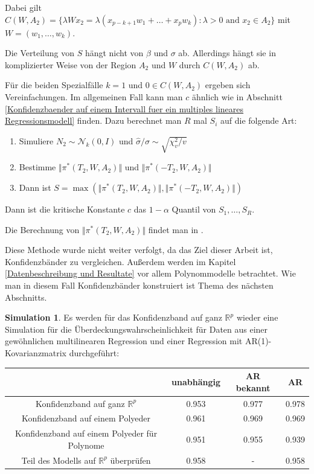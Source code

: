 \documentclass[12pt,a4paper]{article}
\theoremstyle{definition}
\theoremstyle{definition}
\theoremstyle{definition}
\newtheorem{Simulation}[Definition]{Simulation}
\theoremstyle{definition}
\newcommand{\UeberRR}{0.953}
\newcommand{\UeberRMinmax}{0.961}
\newcommand{\UeberRMinmaxPolyfast}{0.951}
\newcommand{\UeberARbekanntR}{0.977}
\newcommand{\UeberARbekanntMinmax}{0.969}
\newcommand{\UeberARbekanntMinmaxPolyfast}{0.955}
\newcommand{\UeberARR}{0.978}
\newcommand{\UeberARMinmax}{0.969}
\newcommand{\UeberARMinmaxPolyfast}{0.939}
\newcommand{\UeberRRpruefen}{0.958}
\newcommand{\UeberARRpruefen}{0.958}
\begin{document}
Dabei gilt $C(W,A_2)=\{ \lambda W x_2 = \lambda(x_{p-k+1} w_1 + \ldots + x_p w_k) : \lambda > 0 \text{ and } x_2 \in A_2 \}$ mit $W=(w_1, \ldots, w_k)$. 

Die Verteilung von $S$ hängt nicht von $\beta$ und $\sigma$ ab. Allerdings hängt sie in komplizierter Weise von der Region $A_2$ und $W$ durch $C(W,A_2)$ ab.

Für die beiden Spezialfälle $k=1$ und $0 \in C(W,A_2)$ ergeben sich Vereinfachungen. Im allgemeinen Fall kann man $c$ ähnlich wie in Abschnitt \ref{Konfidenzbaender auf einem Intervall fuer ein multiples lineares Regressionsmodell} finden. Dazu berechnet man $R$ mal $S_i$ auf die folgende Art:

\begin{enumerate}
\item Simuliere $N_2 \sim \mathscr{N}_{k}(0,I)$ und $\hat{\sigma}/\sigma \sim \sqrt{\chi^2_v/v}$
\item Bestimme $\Vert \pi^{*}(T_2,W,A_2) \Vert$ und $\Vert \pi^{*}(-T_2,W,A_2) \Vert$
\item Dann ist $S= \max(\Vert \pi^{*}(T_2,W,A_2) \Vert, \Vert \pi^{*}(-T_2,W,A_2) \Vert )$
\end{enumerate}

Dann ist die kritische Konstante $c$ das $1-\alpha$ Quantil von $S_1, \ldots, S_R$.

Die Berechnung von $\Vert \pi^{*}(T_2,W,A_2) \Vert$ findet man in \cite[Appendix B]{Liu64}.

Diese Methode wurde nicht weiter verfolgt, da das Ziel dieser Arbeit ist, Konfidenzbänder zu vergleichen. Außerdem werden im Kapitel \ref{Datenbeschreibung und Resultate} vor allem Polynommodelle betrachtet. Wie man in diesem Fall Konfidenzbänder konstruiert ist Thema des nächsten Abschnitts.

\begin{Simulation}
Es werden für das Konfidenzband auf ganz $\mathbb{R}^{p}$ wieder eine Simulation für die Überdeckungswahrscheinlichkeit für Daten aus einer gewöhnlichen multilinearen Regression und einer Regression mit AR(1)-Kovarianzmatrix durchgeführt:


\begin{center}
\begin{tabular}{|c|c|c|c|}
\hline 
 & unabhängig & AR bekannt & AR \\ 
\hline 
Konfidenzband auf ganz $\mathbb{R}^{p}$		 & \UeberRR		  & \UeberARbekanntR & \UeberARR \\ 
\hline 
Konfidenzband auf einem Polyeder	 & \UeberRMinmax  & \UeberARbekanntMinmax & \UeberARMinmax \\ 
\hline 
Konfidenzband auf einem Polyeder für Polynome  & \UeberRMinmaxPolyfast & \UeberARbekanntMinmaxPolyfast & \UeberARMinmaxPolyfast \\ 
\hline 
 Teil des Modells auf $\mathbb{R}^{p}$ überprüfen 	& \UeberRRpruefen & - & \UeberARRpruefen \\ 
\hline 
\end{tabular} 
\end{center}

\end{Simulation}
\end{document}
